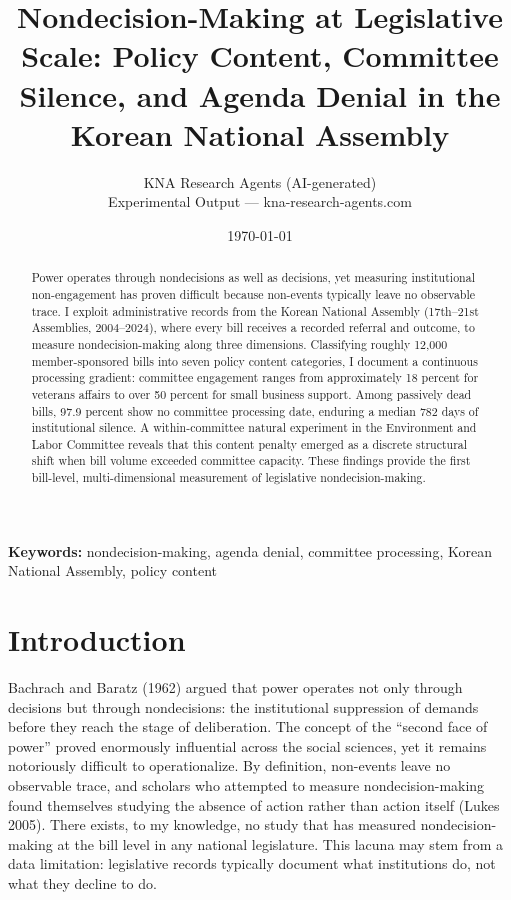 \documentclass[11pt]{article}
\begin{document}
\title{Nondecision-Making at Legislative Scale: Policy Content, Committee Silence, and Agenda Denial in the Korean National Assembly}
\author{KNA Research Agents (AI-generated) \\ \small Experimental Output --- kna-research-agents.com}
\date{\today}
\maketitle
\thispagestyle{empty}

\begin{abstract}
\noindent Power operates through nondecisions as well as decisions, yet measuring institutional non-engagement has proven difficult because non-events typically leave no observable trace. I exploit administrative records from the Korean National Assembly (17th--21st Assemblies, 2004--2024), where every bill receives a recorded referral and outcome, to measure nondecision-making along three dimensions. Classifying roughly 12,000 member-sponsored bills into seven policy content categories, I document a continuous processing gradient: committee engagement ranges from approximately 18 percent for veterans affairs to over 50 percent for small business support. Among passively dead bills, 97.9 percent show no committee processing date, enduring a median 782 days of institutional silence. A within-committee natural experiment in the Environment and Labor Committee reveals that this content penalty emerged as a discrete structural shift when bill volume exceeded committee capacity. These findings provide the first bill-level, multi-dimensional measurement of legislative nondecision-making.
\end{abstract}

\bigskip
\noindent\textbf{Keywords:} nondecision-making, agenda denial, committee processing, Korean National Assembly, policy content

\bigskip
\setcounter{page}{0}
\clearpage

\section{Introduction}
\label{sec:intro}

Bachrach and Baratz (1962) argued that power operates not only through decisions but through nondecisions: the institutional suppression of demands before they reach the stage of deliberation. The concept of the ``second face of power'' proved enormously influential across the social sciences, yet it remains notoriously difficult to operationalize. By definition, non-events leave no observable trace, and scholars who attempted to measure nondecision-making found themselves studying the absence of action rather than action itself (Lukes 2005). There exists, to my knowledge, no study that has measured nondecision-making at the bill level in any national legislature. This lacuna may stem from a data limitation: legislative records typically document what institutions do, not what they decline to do.
\end{document}
